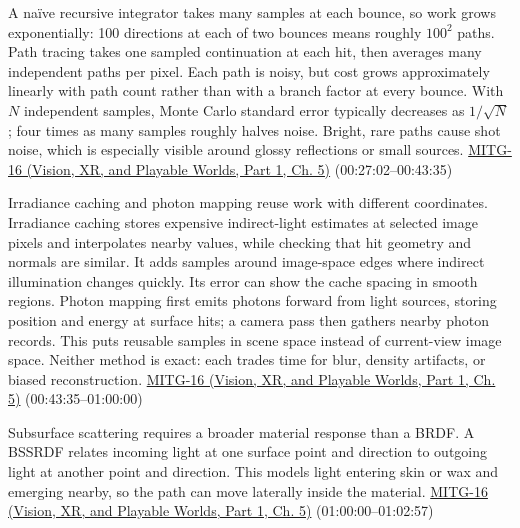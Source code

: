 A naïve recursive integrator takes many samples at each bounce, so work grows exponentially: 100 directions at each of two bounces means roughly \(100^2\) paths. Path tracing takes one sampled continuation at each hit, then averages many independent paths per pixel. Each path is noisy, but cost grows approximately linearly with path count rather than with a branch factor at every bounce. With \(N\) independent samples, Monte Carlo standard error typically decreases as \(1/\sqrt{N}\); four times as many samples roughly halves noise. Bright, rare paths cause shot noise, which is especially visible around glossy reflections or small sources. \href{../07-Vision-XR-and-Playable-Worlds-P01/main.pdf\#04-visual-computing-ii-ch036-mitg-16---global-illumination}{MITG-16 (Vision, XR, and Playable Worlds, Part 1, Ch. 5)} (00:27:02--00:43:35)

Irradiance caching and photon mapping reuse work with different coordinates. Irradiance caching stores expensive indirect-light estimates at selected image pixels and interpolates nearby values, while checking that hit geometry and normals are similar. It adds samples around image-space edges where indirect illumination changes quickly. Its error can show the cache spacing in smooth regions. Photon mapping first emits photons forward from light sources, storing position and energy at surface hits; a camera pass then gathers nearby photon records. This puts reusable samples in scene space instead of current-view image space. Neither method is exact: each trades time for blur, density artifacts, or biased reconstruction. \href{../07-Vision-XR-and-Playable-Worlds-P01/main.pdf\#04-visual-computing-ii-ch036-mitg-16---global-illumination}{MITG-16 (Vision, XR, and Playable Worlds, Part 1, Ch. 5)} (00:43:35--01:00:00)

Subsurface scattering requires a broader material response than a BRDF. A BSSRDF relates incoming light at one surface point and direction to outgoing light at another point and direction. This models light entering skin or wax and emerging nearby, so the path can move laterally inside the material. \href{../07-Vision-XR-and-Playable-Worlds-P01/main.pdf\#04-visual-computing-ii-ch036-mitg-16---global-illumination}{MITG-16 (Vision, XR, and Playable Worlds, Part 1, Ch. 5)} (01:00:00--01:02:57)


